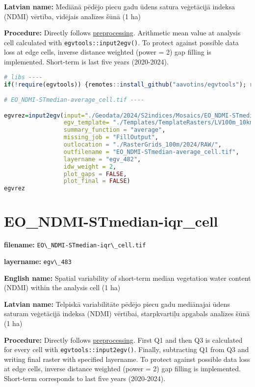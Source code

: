 \documentclass[
]{book}
\newcommand{\passthrough}[1]{#1}
\begin{document}
\textbf{Latvian name:} Mediānā pēdējo piecu gadu ūdens satura veģetācijā indeksa (NDMI) vērtība, vidējais analīzes šūnā (1 ha)

\textbf{Procedure:} Directly follows \hyperref[Ch04.13]{preprocessing}. Arithmetic mean value at analysis cell
calculated with \passthrough{\lstinline!egvtools::input2egv()!}. To protect against possible data loss at edge cells,
inverse distance weighted (power = 2) gap filling is implemented. Short-term is last five years (2020-2024).

\begin{lstlisting}[language=R]
# libs ----
if(!require(egvtools)) {remotes::install_github("aavotins/egvtools"); require(egvtools)}

# EO_NDMI-STmedian-average_cell.tif ----

egvrez=input2egv(input="./Geodata/2024/S2indices/Mosaics/EO_NDMI-STmedian.tif",
                 egv_template= "./Templates/TemplateRasters/LV100m_10km.tif",
                 summary_function = "average",
                 missing_job = "FillOutput",
                 outlocation = "./RasterGrids_100m/2024/RAW/",
                 outfilename = "EO_NDMI-STmedian-average_cell.tif",
                 layername = "egv_482",
                 idw_weight = 2,
                 plot_gaps = FALSE,
                 plot_final = FALSE)
egvrez
\end{lstlisting}

\section{EO\_NDMI-STmedian-iqr\_cell}\label{ch06.483}

\textbf{filename:} \passthrough{\lstinline!EO\_NDMI-STmedian-iqr\_cell.tif!}

\textbf{layername:} \passthrough{\lstinline!egv\_483!}

\textbf{English name:} Spatial variability of short-term median vegetation water content (NDMI) within the analysis cell (1 ha)

\textbf{Latvian name:} Telpiskā variabilitāte pēdējo piecu gadu mediānajai ūdens saturam veģetācijā indeksa (NDMI) vērtībai, starpkvartiļu apgabals analīzes šūnā (1 ha)

\textbf{Procedure:} Directly follows \hyperref[Ch04.13]{preprocessing}. First Q1 and then Q3
is calculated for every cell with \passthrough{\lstinline!egvtools::input2egv()!}. Finally, subtracting
Q1 from Q3 and writing final raster with specified layername. To protect against possible data loss at edge cells,
inverse distance weighted (power = 2) gap filling is implemented. Short-term corresponds
to last five years (2020-2024).
\end{document}
